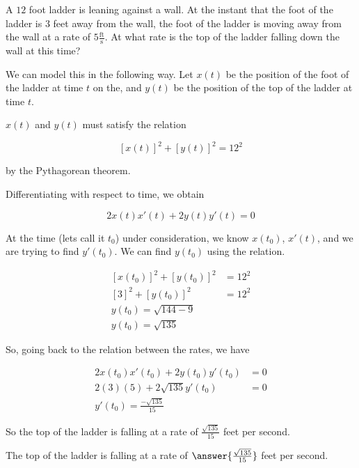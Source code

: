 \documentclass{ximera}
\author{Steven Gubkin}
\begin{document}
\begin{exercise}



A $12$ foot ladder is leaning against a wall.  At the instant that the foot of the ladder is $3$ feet away from the wall, the foot of the ladder is moving away from the wall at a rate of $5 \frac{\textrm{ft}}{\textrm{s}}$.  At what rate is the top of the ladder falling down the wall at this time?

\begin{hint}
We can model this in the following way.  Let $x(t)$ be the position of the foot of the ladder at time $t$ on the, and $y(t)$ be the position of the top of the ladder at time $t$. 
\end{hint}

\begin{hint}
	$x(t)$ and $y(t)$ must satisfy the relation

\[
\left[ x(t) \right]^2 + \left[ y(t)\right]^2 = 12^2
\]

by the Pythagorean theorem.
\end{hint}

\begin{hint}
	Differentiating with respect to time, we obtain

\[
2x(t)x'(t)+2y(t)y'(t) = 0
\]
\end{hint}

\begin{hint}
	At the time (lets call it $t_0$) under consideration, we know $x(t_0)$, $x'(t)$, and we are trying to find $y'(t_0)$.  We can find $y(t_0)$ using the relation.  

\begin{align*}
	\left[ x(t_0) \right]^2 + \left[ y(t_0)\right]^2 &= 12^2\\
	\left[ 3 \right]^2 + \left[ y(t_0)\right]^2 &= 12^2\\
	y(t_0) = \sqrt{144-9}\\
	y(t_0) = \sqrt{135}
\end{align*}
\end{hint}

\begin{hint}
	So, going back to the relation between the rates, we have

\begin{align*}
2x(t_0)x'(t_0)+2y(t_0)y'(t_0) &= 0\\
2(3)(5)+2\sqrt{135}y'(t_0) &=0\\
y'(t_0) = \frac{-\sqrt{135}}{15}
\end{align*}

So the top of the ladder is falling at  a rate of $\frac{\sqrt{135}}{15}$ feet per second.

\end{hint}

\begin{prompt}
	The top of the ladder is falling at a rate of $\answer{\frac{\sqrt{135}}{15}}$ feet per second.
\end{prompt}

\end{exercise}
\end{document}
